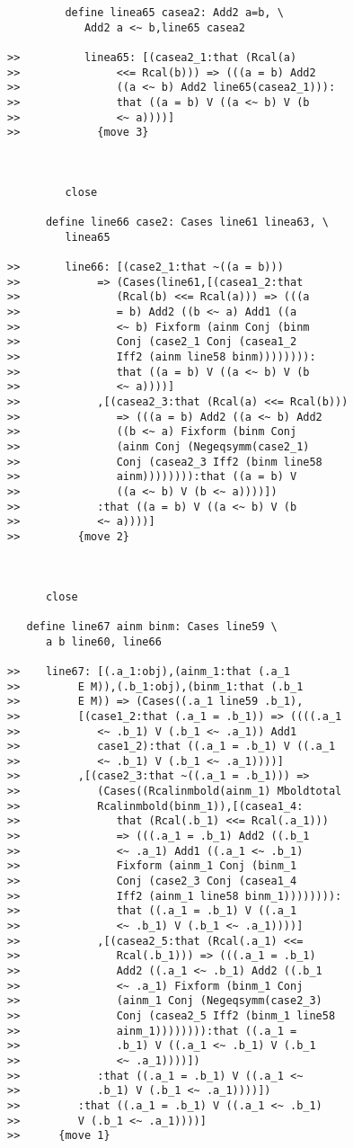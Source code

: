 \documentclass[12pt]{article}
\begin{document}
\begin{verbatim}
         define linea65 casea2: Add2 a=b, \
            Add2 a <~ b,line65 casea2

>>          linea65: [(casea2_1:that (Rcal(a)
>>               <<= Rcal(b))) => (((a = b) Add2
>>               ((a <~ b) Add2 line65(casea2_1))):
>>               that ((a = b) V ((a <~ b) V (b
>>               <~ a))))]
>>            {move 3}



         close

      define line66 case2: Cases line61 linea63, \
         linea65

>>       line66: [(case2_1:that ~((a = b)))
>>            => (Cases(line61,[(casea1_2:that
>>               (Rcal(b) <<= Rcal(a))) => (((a
>>               = b) Add2 ((b <~ a) Add1 ((a
>>               <~ b) Fixform (ainm Conj (binm
>>               Conj (case2_1 Conj (casea1_2
>>               Iff2 (ainm line58 binm)))))))):
>>               that ((a = b) V ((a <~ b) V (b
>>               <~ a))))]
>>            ,[(casea2_3:that (Rcal(a) <<= Rcal(b)))
>>               => (((a = b) Add2 ((a <~ b) Add2
>>               ((b <~ a) Fixform (binm Conj
>>               (ainm Conj (Negeqsymm(case2_1)
>>               Conj (casea2_3 Iff2 (binm line58
>>               ainm)))))))):that ((a = b) V
>>               ((a <~ b) V (b <~ a))))])
>>            :that ((a = b) V ((a <~ b) V (b
>>            <~ a))))]
>>         {move 2}



      close

   define line67 ainm binm: Cases line59 \
      a b line60, line66

>>    line67: [(.a_1:obj),(ainm_1:that (.a_1
>>         E M)),(.b_1:obj),(binm_1:that (.b_1
>>         E M)) => (Cases((.a_1 line59 .b_1),
>>         [(case1_2:that (.a_1 = .b_1)) => ((((.a_1
>>            <~ .b_1) V (.b_1 <~ .a_1)) Add1
>>            case1_2):that ((.a_1 = .b_1) V ((.a_1
>>            <~ .b_1) V (.b_1 <~ .a_1))))]
>>         ,[(case2_3:that ~((.a_1 = .b_1))) =>
>>            (Cases((Rcalinmbold(ainm_1) Mboldtotal
>>            Rcalinmbold(binm_1)),[(casea1_4:
>>               that (Rcal(.b_1) <<= Rcal(.a_1)))
>>               => (((.a_1 = .b_1) Add2 ((.b_1
>>               <~ .a_1) Add1 ((.a_1 <~ .b_1)
>>               Fixform (ainm_1 Conj (binm_1
>>               Conj (case2_3 Conj (casea1_4
>>               Iff2 (ainm_1 line58 binm_1)))))))):
>>               that ((.a_1 = .b_1) V ((.a_1
>>               <~ .b_1) V (.b_1 <~ .a_1))))]
>>            ,[(casea2_5:that (Rcal(.a_1) <<=
>>               Rcal(.b_1))) => (((.a_1 = .b_1)
>>               Add2 ((.a_1 <~ .b_1) Add2 ((.b_1
>>               <~ .a_1) Fixform (binm_1 Conj
>>               (ainm_1 Conj (Negeqsymm(case2_3)
>>               Conj (casea2_5 Iff2 (binm_1 line58
>>               ainm_1)))))))):that ((.a_1 =
>>               .b_1) V ((.a_1 <~ .b_1) V (.b_1
>>               <~ .a_1))))])
>>            :that ((.a_1 = .b_1) V ((.a_1 <~
>>            .b_1) V (.b_1 <~ .a_1))))])
>>         :that ((.a_1 = .b_1) V ((.a_1 <~ .b_1)
>>         V (.b_1 <~ .a_1))))]
>>      {move 1}




\end{verbatim}
\end{document}
